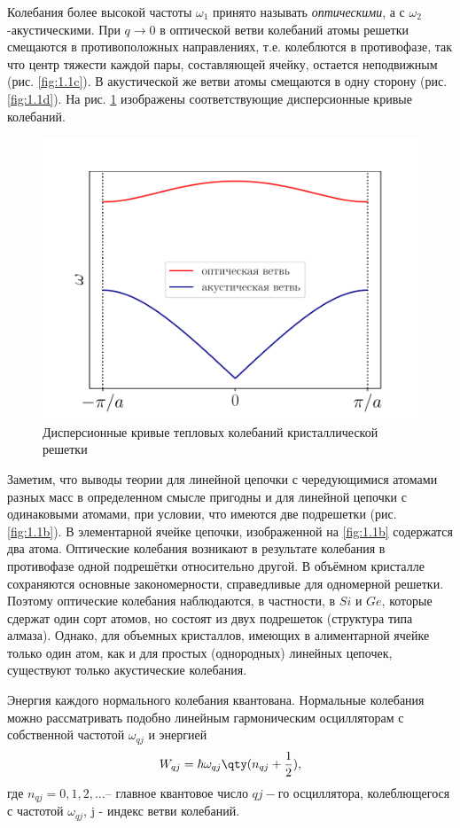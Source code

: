 Колебания более высокой частоты $\omega_1$  принято называть \textit{оптическими}, а 
с $\omega_2$-акустическими. При $q\rightarrow 0$ в оптической ветви колебаний атомы 
решетки смещаются в противоположных направлениях, т.е. колеблются в противофазе, так что
центр тяжести каждой пары, составляющей ячейку, остается неподвижным
(рис. \ref{fig:1.1c}). В акустической же ветви атомы смещаются в одну сторону
(рис. \ref{fig:1.1d}). На рис. \ref{fig:2} изображены соответствующие дисперсионные кривые колебаний.
\begin{figure}[h!]
	\centering
	\includegraphics[width=0.5\linewidth]{fig/fig1_2}
	\caption{Дисперсионные кривые тепловых колебаний кристаллической решетки}
	\label{fig:2}
\end{figure}

Заметим, что выводы теории для линейной цепочки с чередующимися атомами разных масс в определенном смысле пригодны и для линейной цепочки с одинаковыми атомами, при условии, что имеются две подрешетки (рис. \ref{fig:1.1b}). В элементарной ячейке цепочки, изображенной на \ref{fig:1.1b} содержатся два атома. Оптические колебания возникают 
в результате колебания в противофазе одной подрешётки  относительно другой. В объёмном кристалле сохраняются основные закономерности, справедливые для одномерной решетки. Поэтому оптические колебания наблюдаются, в частности, в $Si$ и $Ge$, которые сдержат один
сорт атомов, но состоят из двух подрешеток (структура типа алмаза). Однако,
для объемных кристаллов, имеющих в алиментарной ячейке только один атом,
как и для простых (однородных) линейных цепочек, существуют только акустические колебания.

Энергия каждого нормального колебания квантована. Нормальные колебания  можно рассматривать подобно линейным гармоническим осцилляторам с собственной частотой $\omega_{qj}$ и энергией
\begin{equation}
	W_{qj}=\hbar \omega_{qj}\qty(n_{qj}+\frac12),
\end{equation}
где $n_{qj}=0,1,2,\dots$-- главное квантовое число $qj-$го осциллятора, колеблющегося с частотой
$\omega_{qj}$, j - индекс ветви колебаний. 

